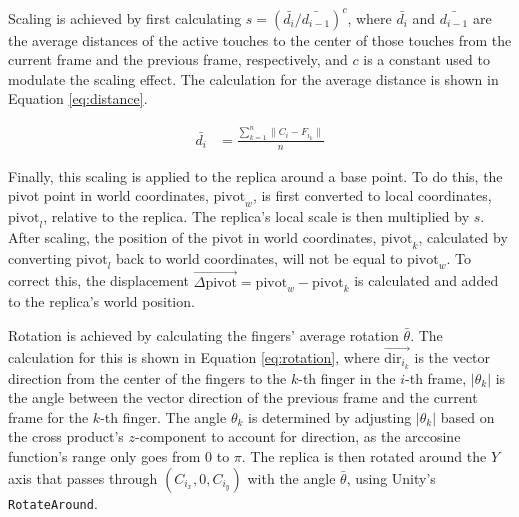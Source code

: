     Scaling is achieved by first calculating $s = {{(\bar{d_i} / \bar{d_{i-1}})}^{c}}$, where \(\bar{d_i}\) and \(\bar{d_{i-1}}\) are the average distances of the active touches to the center of those touches from the current frame and the previous frame, respectively, and \(c\) is a constant used to modulate the scaling effect. The calculation for the average distance is shown in Equation \ref{eq:distance}.
    
    \begin{figure}[h]
    \begin{equation}
    \begin{split} \label{eq:distance}
        \bar{d_i} &= \frac{\sum_{k = 1}^{n} \| C_i - F_{i_k} \|}{n}
    \end{split}
    \end{equation}
    \end{figure}
    
    Finally, this scaling is applied to the replica around a base point. To do this, the pivot point in world coordinates, \(\mathrm{pivot}_w\), is first converted to local coordinates, \(\mathrm{pivot}_l\), relative to the replica. The replica's local scale is then multiplied by \(s\). After scaling, the position of the pivot in world coordinates, \(\mathrm{pivot}_k\), calculated by converting \(\mathrm{pivot}_l\) back to world coordinates, will not be equal to \(\mathrm{pivot}_w\). To correct this, the displacement \(\vec{\Delta \mathrm{pivot}} = \mathrm{pivot}_w - \mathrm{pivot}_k\) is calculated and added to the replica's world position.

    Rotation is achieved by calculating the fingers' average rotation \(\bar{\theta}\). The calculation for this is shown in Equation \ref{eq:rotation}, where \(\vec{\mathrm{dir}_{i_k}}\) is the vector direction from the center of the fingers to the \(k\)-th finger in the \(i\)-th frame, \(|\theta_k|\) is the angle between the vector direction of the previous frame and the current frame for the \(k\)-th finger. The angle \(\theta_k\) is determined by adjusting \(|\theta_k|\) based on the cross product's \(z\)-component to account for direction, as the arccosine function's range only goes from \(0\) to \(\pi\). The replica is then rotated around the \(Y\) axis that passes through \((C_{i_x}, 0, C_{i_y})\) with the angle $\bar{\theta}$, using Unity's \lstinline{RotateAround}.

